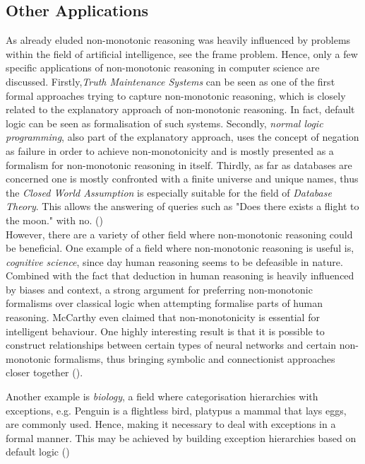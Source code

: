 \documentclass{extarticle}
\begin{document}
\subsection{Other Applications}
As already eluded non-monotonic reasoning was heavily influenced by problems within the field of artificial intelligence, see the frame problem. Hence, only a few specific applications of non-monotonic reasoning in computer science are discussed. Firstly,\emph{Truth Maintenance Systems} can be seen as one of the first formal approaches trying to capture non-monotonic reasoning, which is closely related to the explanatory approach of non-monotonic reasoning. In fact, default logic can be seen as formalisation of such systems. Secondly, \emph{normal logic programming}, also part of the explanatory approach, uses the concept of negation as failure in order to achieve non-monotonicity and is mostly presented as a formalism for non-monotonic reasoning in itself. Thirdly, as far as databases are concerned one is mostly confronted with a finite universe and unique names, thus the \emph{Closed World Assumption} is especially suitable for the field of \emph{Database Theory}. This allows the answering of queries such as "Does there exists a flight to the moon." with no. (\cite{brewka1997nonmonotonic,BOCHMAN2007557}) \\

However, there are a variety of other field where non-monotonic reasoning could be beneficial. One example of a field where non-monotonic reasoning is useful is,  \emph{cognitive science}, since day human reasoning seems to be defeasible in nature. Combined with the fact that deduction in human reasoning is heavily influenced by biases and context, a strong argument for preferring non-monotonic formalisms over classical logic when attempting formalise parts of human reasoning. McCarthy even claimed that non-monotonicity is essential for intelligent behaviour. One highly interesting result is that it is possible to construct relationships between certain types of neural networks and certain non-monotonic formalisms, thus bringing symbolic and connectionist approaches closer together (\cite{isaac2014logic,evans2002logic}).

Another example is \emph{biology}, a field where categorisation hierarchies with exceptions, e.g. Penguin is a flightless bird, platypus a mammal that lays eggs, are commonly used. Hence, making it necessary to deal with exceptions in a formal manner. This may be achieved by building exception hierarchies based on default logic
(\cite{ANTONIOU2007517})
\end{document}

